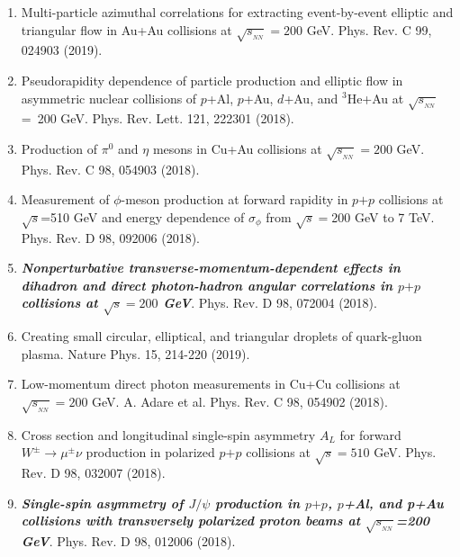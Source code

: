 \documentclass[11pt]{article}
\newcommand{\snn}{\sqrt{s_{_{NN}}}}
\begin{document}
\begin{flushleft}
\begin{center}
\begin{enumerate}
		\item Multi-particle azimuthal correlations for extracting event-by-event elliptic and triangular flow in Au+Au collisions at $\snn=200$ GeV. Phys. Rev. C 99, 024903 (2019).
		\item Pseudorapidity dependence of particle production and elliptic flow in asymmetric nuclear collisions of $p$+Al, $p$+Au, $d$+Au, and $^3$He+Au at $\sqrt{s_{_{NN}}}$=~200 GeV. Phys. Rev. Lett. 121, 222301 (2018).
		\item Production of $\pi^0$ and $\eta$ mesons in Cu+Au collisions at $\snn=200$ GeV. Phys. Rev. C 98, 054903 (2018).
		\item Measurement of $\phi$-meson production at forward rapidity in $p$$+$$p$ collisions at $\sqrt{s}$=510 GeV and energy dependence of $\sigma_\phi$ from $\sqrt{s}=$200 GeV to 7 TeV. Phys. Rev. D 98, 092006 (2018).
		
		\item \textbf{\textit{Nonperturbative transverse-momentum-dependent effects in dihadron and direct photon-hadron angular correlations in $p$$+$$p$ collisions at $\sqrt{s}=200$ GeV}}. Phys. Rev. D 98, 072004 (2018).	
		\item Creating small circular, elliptical, and triangular droplets of quark-gluon plasma. Nature Phys. 15, 214-220 (2019).
		\item Low-momentum direct photon measurements in Cu+Cu collisions at $\snn=200$ GeV. A. Adare et al. Phys. Rev. C 98, 054902 (2018).
		\item Cross section and longitudinal single-spin asymmetry $A_L$ for forward $W^\pm\rightarrow\mu^\pm\nu$ production in polarized $p$$+$$p$ collisions at $\sqrt{s}=510$ GeV. Phys. Rev. D 98, 032007 (2018).
		
		\item \textbf{\textit{Single-spin asymmetry of $J/\psi$ production in $p$$+$$p$, $p$+Al, and p+Au collisions with transversely polarized proton beams at $\snn$=200 GeV}}. Phys. Rev. D 98, 012006 (2018).
		

\end{enumerate}
\end{center}
\end{flushleft}
\end{document}
